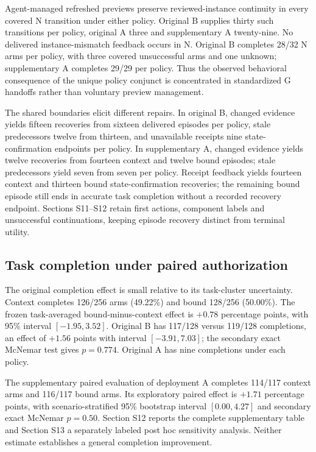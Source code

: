 \documentclass[10pt,a4paper,twocolumn]{article}
\begin{document}
Agent-managed refreshed previews preserve reviewed-instance continuity in every covered N transition under either policy. Original B supplies thirty such transitions per policy, original A three and supplementary A twenty-nine. No delivered instance-mismatch feedback occurs in N. Original B completes 28/32 N arms per policy, with three covered unsuccessful arms and one unknown; supplementary A completes 29/29 per policy. Thus the observed behavioral consequence of the unique policy conjunct is concentrated in standardized G handoffs rather than voluntary preview management.

The shared boundaries elicit different repairs. In original B, changed evidence yields fifteen recoveries from sixteen delivered episodes per policy, stale predecessors twelve from thirteen, and unavailable receipts nine state-confirmation endpoints per policy. In supplementary A, changed evidence yields twelve recoveries from fourteen context and twelve bound episodes; stale predecessors yield seven from seven per policy. Receipt feedback yields fourteen context and thirteen bound state-confirmation recoveries; the remaining bound episode still ends in accurate task completion without a recorded recovery endpoint. Sections S11--S12 retain first actions, component labels and unsuccessful continuations, keeping episode recovery distinct from terminal utility.

\subsection{Task completion under paired authorization}
The original completion effect is small relative to its task-cluster uncertainty. Context completes 126/256 arms (49.22\%) and bound 128/256 (50.00\%). The frozen task-averaged bound-minus-context effect is $+0.78$ percentage points, with 95\% interval $[-1.95,3.52]$. Original B has 117/128 versus 119/128 completions, an effect of $+1.56$ points with interval $[-3.91,7.03]$; the secondary exact McNemar test gives $p=0.774$. Original A has nine completions under each policy.

The supplementary paired evaluation of deployment A completes 114/117 context arms and 116/117 bound arms. Its exploratory paired effect is $+1.71$ percentage points, with scenario-stratified 95\% bootstrap interval $[0.00,4.27]$ and secondary exact McNemar $p=0.50$. Section S12 reports the complete supplementary table and Section S13 a separately labeled post hoc sensitivity analysis. Neither estimate establishes a general completion improvement.
\end{document}
